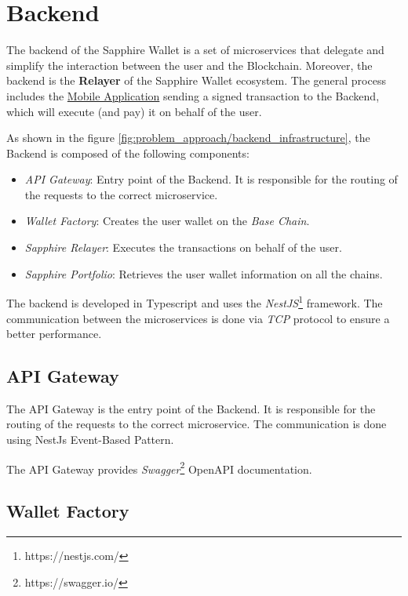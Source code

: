 \section{Backend}
\label{sec:backend}

The backend of the Sapphire Wallet is a set of microservices that delegate and simplify the interaction between the user and the Blockchain. Moreover, the backend is the \textbf{Relayer} of the Sapphire Wallet ecosystem. The general process includes the \hyperref[sec:mobile_application]{Mobile Application} sending a signed transaction to the Backend, which will execute (and pay) it on behalf of the user.

As shown in the figure \ref{fig:problem_approach/backend_infrastructure}, the Backend is composed of the following components:
\begin{itemize}
    \item \textit{API Gateway}: Entry point of the Backend. It is responsible for the routing of the requests to the correct microservice.
    \item \textit{Wallet Factory}: Creates the user wallet on the \textit{Base Chain}.
    \item \textit{Sapphire Relayer}: Executes the transactions on behalf of the user.
    \item \textit{Sapphire Portfolio}: Retrieves the user wallet information on all the chains.
\end{itemize}


The backend is developed in Typescript and uses the \textit{NestJS}\footnote{https://nestjs.com/} framework. The communication between the microservices is done via \textit{TCP} protocol to ensure a better performance. 

\subsection{API Gateway}
\label{subsec:api_gateway}

The API Gateway is the entry point of the Backend. It is responsible for the routing of the requests to the correct microservice. The communication is done using NestJs Event-Based Pattern. 

The API Gateway provides \textit{Swagger}\footnote{https://swagger.io/} OpenAPI documentation.

\subsection{Wallet Factory}
\label{subsec:wallet_factory}


